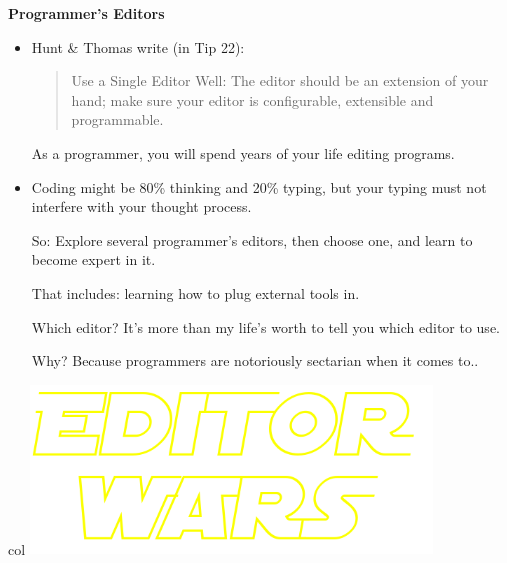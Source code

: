 \documentclass[aspectratio=169]{beamer}
\newcommand\myheading[1]{%
  \par\bigskip
  {\Large\bfseries#1}\par\smallskip}
\begin{document}
\begin{frame}
  \myheading{Programmer's Editors}
  \begin{itemize}
    \item
	  Hunt \& Thomas write (in Tip 22):
\begin{quote}
Use a Single Editor Well:
The editor should be an extension of your hand;
make sure your editor is configurable,
extensible and programmable.
\end{quote}
    \pitem
    As a programmer, you will spend \alert{years of your life} editing programs.

    \item
    Coding might be 80\% thinking and 20\% typing, but your
    typing must not interfere with your thought process.

    \pitem
    So: Explore several programmer's editors, then choose one,
    and learn to become \alert{expert in it}.

    \pitem
    That includes: learning \alert{how to plug external tools in}.

    \pitem
    Which editor?
    \pause
    It's more than my life's worth to tell you which editor to use.

    \pitem
    Why? Because programmers are notoriously sectarian when it comes to..
  \end{itemize}
\end{frame}

\begin{frame}[plain]
\begin{beamercolorbox}[wd=1.1\textwidth, ht=1.1\textheight]{col}
\centering
\vspace{70pt}
\includegraphics[width=0.8\textwidth]{editorWars.png}
\end{beamercolorbox}
\end{frame}
\end{document}
